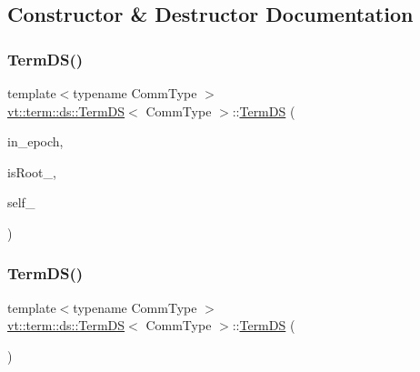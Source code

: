 \subsection{Constructor \& Destructor Documentation}
\mbox{\label{structvt_1_1term_1_1ds_1_1_term_d_s_a1873de7f6d3009bd997c64eefb46d9b5}} 
\subsubsection{\texorpdfstring{Term\+D\+S()}{TermDS()}\hspace{0.1cm}{\footnotesize\ttfamily [1/3]}}
{\footnotesize\ttfamily template$<$typename Comm\+Type $>$ \\
\hyperlink{structvt_1_1term_1_1ds_1_1_term_d_s}{vt\+::term\+::ds\+::\+Term\+DS}$<$ Comm\+Type $>$\+::\hyperlink{structvt_1_1term_1_1ds_1_1_term_d_s}{Term\+DS} (\begin{DoxyParamCaption}\item[{\hyperlink{namespacevt_a985a5adf291c34a3ca263b3378388236}{Epoch\+Type}}]{in\+\_\+epoch,  }\item[{bool}]{is\+Root\+\_\+,  }\item[{\hyperlink{namespacevt_a866da9d0efc19c0a1ce79e9e492f47e2}{Node\+Type}}]{self\+\_\+ }\end{DoxyParamCaption})}

\mbox{\label{structvt_1_1term_1_1ds_1_1_term_d_s_a01ffd2a7fc4410599708c3fcb5998743}} 
\subsubsection{\texorpdfstring{Term\+D\+S()}{TermDS()}\hspace{0.1cm}{\footnotesize\ttfamily [2/3]}}
{\footnotesize\ttfamily template$<$typename Comm\+Type $>$ \\
\hyperlink{structvt_1_1term_1_1ds_1_1_term_d_s}{vt\+::term\+::ds\+::\+Term\+DS}$<$ Comm\+Type $>$\+::\hyperlink{structvt_1_1term_1_1ds_1_1_term_d_s}{Term\+DS} (\begin{DoxyParamCaption}\item[{\hyperlink{structvt_1_1term_1_1ds_1_1_term_d_s}{Term\+DS}$<$ Comm\+Type $>$ \&\&}]{ }\end{DoxyParamCaption})\hspace{0.3cm}{\ttfamily [default]}}

